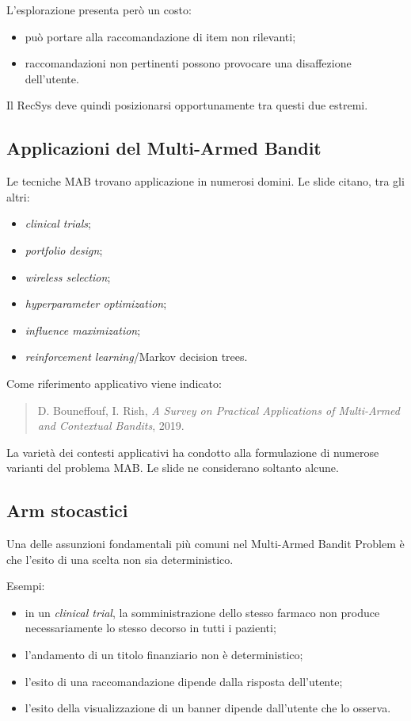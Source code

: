 L'esplorazione presenta però un costo:
\begin{itemize}
    \item può portare alla raccomandazione di item non rilevanti;
    \item raccomandazioni non pertinenti possono provocare una disaffezione dell'utente.
\end{itemize}

Il RecSys deve quindi posizionarsi opportunamente tra questi due estremi.

\subsection{Applicazioni del Multi-Armed Bandit}

Le tecniche MAB trovano applicazione in numerosi domini. Le slide citano, tra gli altri:
\begin{itemize}
    \item \emph{clinical trials};
    \item \emph{portfolio design};
    \item \emph{wireless selection};
    \item \emph{hyperparameter optimization};
    \item \emph{influence maximization};
    \item \emph{reinforcement learning}/Markov decision trees.
\end{itemize}

Come riferimento applicativo viene indicato:
\begin{quote}
D. Bouneffouf, I. Rish, \emph{A Survey on Practical Applications of Multi-Armed and Contextual Bandits}, 2019.
\end{quote}

La varietà dei contesti applicativi ha condotto alla formulazione di numerose varianti del problema MAB. Le slide ne considerano soltanto alcune.

\subsection{Arm stocastici}

Una delle assunzioni fondamentali più comuni nel Multi-Armed Bandit Problem è che l'esito di una scelta non sia deterministico.

Esempi:
\begin{itemize}
    \item in un \emph{clinical trial}, la somministrazione dello stesso farmaco non produce necessariamente lo stesso decorso in tutti i pazienti;
    \item l'andamento di un titolo finanziario non è deterministico;
    \item l'esito di una raccomandazione dipende dalla risposta dell'utente;
    \item l'esito della visualizzazione di un banner dipende dall'utente che lo osserva.
\end{itemize}

